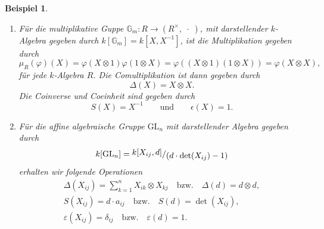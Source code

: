 \documentclass[a4paper, 11pt]{scrartcl}
\newcommand{\ringquot}[2]{{\raisebox{.2em}{\(#1\)}/\raisebox{-.2em}{\(#2\)}}}
\theoremstyle{basicstyle}
\newtheorem{beispiel}[definition]{Beispiel}
\begin{document}
\begin{beispiel}
\begin{enumerate}
            \item Für die multiplikative Guppe \(\mathbb{G}_m : R \to (R^\times, \;\cdot\;)\), mit darstellender \(k\)-Algebra gegeben durch \(k[\mathbb{G}_m] = k[X, X^{-1}]\), ist die Multiplikation gegeben durch
                \[\mu_R(\varphi)(X) = \varphi(X \otimes 1)\varphi(1 \otimes X) = \varphi((X \otimes 1)(1 \otimes X)) = \varphi(X \otimes X),\]
                für jede \(k\)-Algebra \(R\).
                Die Comultiplikation ist dann gegeben durch 
                \[\Delta (X) = X \otimes X.\]
                Die Coinverse und Coeinheit sind gegeben durch
                \[S(X) = X^{-1} \qquad\text{und}\qquad \epsilon(X) = 1.\]

            \item Für die affine algebraische Gruppe \(\text{GL}_n\) mit darstellender Algebra gegeben durch
                \[k[\text{GL}_n] = \ringquot{k[X_{ij}, d]}{(d \cdot \det(X_{ij}) - 1)}\]
                erhalten wir folgende Operationen
                \begin{gather*}
                    \Delta(X_{ij}) = \sum_{k = 1}^{n} X_{ik} \otimes X_{kj} \quad\text{bzw.}\quad \Delta(d) = d \otimes d, \\
                    S(X_{ij}) = d \cdot a_{ij} \quad\text{bzw.}\quad S(d) = \det(X_{ij}), \\
                    \varepsilon(X_{ij}) = \delta_{ij} \quad\text{bzw.}\quad \varepsilon(d) = 1.
                \end{gather*}
        \end{enumerate}
    \end{beispiel}
\end{document}
